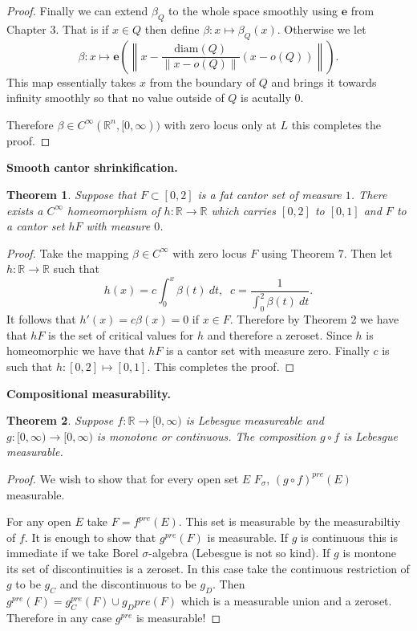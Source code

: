 \documentclass[letter]{article}
\newtheorem{theorem}{Theorem}
\newenvironment{menumerate}{%
  \edef\backupindent{\the\parindent}%
  \enumerate%
  \setlength{\parindent}{\backupindent}%
}{\endenumerate}
\begin{document}
\begin{menumerate}
\begin{proof}
		Finally we can extend $\beta_Q$ to the whole space smoothly using $\textbf{e}$ from Chapter $3$. That is if $x \in Q$ then define $\beta: x \mapsto \beta_Q(x).$ Otherwise we let
		\begin{equation}
			\beta: x \mapsto \textbf{e}\left(\left\|x - \frac{\text{diam}(Q)}{\|x - o(Q)\|}(x - o(Q))  \right\|\right).
		\end{equation}
		This map essentially takes $x$ from the boundary of $Q$ and brings it towards infinity smoothly so that no value outside of $Q$ is acutally $0$.

		Therefore $\beta \in C^\infty(\mathbb{R}^n, [0, \infty))$ with zero locus only at $L$ this completes the proof.
	\end{proof}
	\item \textbf{Smooth cantor shrinkification.}
	\begin{theorem}
		Suppose that $F \subset [0,2]$ is a fat cantor set of measure $1$. There exists a $C^\infty$ homeomorphism of $h: \mathbb{R} \to \mathbb{R}$ which carries $[0,2]$  to $[0,1]$ and $F$ to a cantor set $hF$ with measure $0$.
	\end{theorem}
	\begin{proof}
		Take the mapping $\beta \in C^\infty$ with zero locus $F$ using Theorem 7. Then let $h: \mathbb{R} \to \mathbb{R}$ such that
		\begin{equation}
			h(x) = c\int_0^x \beta(t)\ dt,\;\; c = \frac{1}{\int_0^2 \beta(t)\ dt}.
		 \end{equation} 
		 It follows that $h'(x) = c\beta(x) = 0$ if $x \in F$. Therefore by Theorem 2 we have that $hF$ is the set of critical values for $h$ and therefore a zeroset. Since $h$ is homeomorphic we have that $hF$ is a cantor set with measure zero. Finally $c$ is such that $h : [0,2] \mapsto [0,1].$ This completes the proof.
	\end{proof}
	\item \textbf{Compositional measurability.}
	\begin{theorem}
		Suppose $f: \mathbb{R} \to [0, \infty)$ is Lebesgue measureable and $g: [0, \infty) \to [0, \infty)$ is monotone or continuous. The composition $g \circ f$ is Lebesgue measurable.
	\end{theorem}
	\begin{proof}
		We wish to show that for every open set $E$  $F_\sigma$, $(g \circ f)^{pre}(E)$ measurable.

		For any open $E$ take $F = f^{pre}(E).$ This set is measurable by the measurabiltiy of $f.$ It is enough to show that $g^{pre}(F)$ is measurable. If $g$ is continuous this is immediate if we take Borel $\sigma$-algebra (Lebesgue is not so kind). If $g$ is montone its set of discontinuities is a zeroset. In this case take the continuous restriction of $g$ to be $g_C$ and the discontinuous to be $g_D$.
		Then
		 $g^{pre}(F) = g_C^{pre}(F) \cup g_D{pre}(F)$ which is a measurable union and a zeroset. Therefore in any case $g^{pre}$ is measurable!
	\end{proof}


\end{menumerate}
\end{document}
